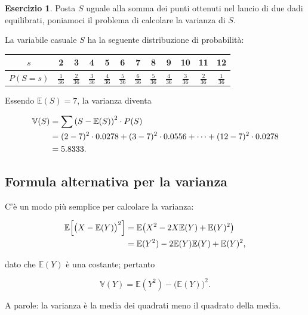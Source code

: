 \documentclass[
  11pt,
]{krantz}
\newcommand{\E}{\mathbb{E}} %
\theoremstyle{definition}
\theoremstyle{definition}
\theoremstyle{definition}
\newtheorem{exercise}{Esercizio}[chapter]
\theoremstyle{definition}
\theoremstyle{remark}
\begin{document}
\begin{exercise}
Posta \(S\) uguale alla somma dei punti ottenuti nel lancio di due dadi equilibrati, poniamoci il problema di calcolare la varianza di \(S\).

La variabile casuale \(S\) ha la seguente distribuzione di probabilità:

\begin{longtable}[]{@{}cccccccccccc@{}}
\toprule
\(s\) & 2 & 3 & 4 & 5 & 6 & 7 & 8 & 9 & 10 & 11 & 12 \\
\midrule
\endhead
\(P(S = s)\) & \(\frac{1}{36}\) & \(\frac{2}{36}\) & \(\frac{3}{36}\) & \(\frac{4}{36}\) & \(\frac{5}{36}\) & \(\frac{6}{36}\) & \(\frac{5}{36}\) & \(\frac{4}{36}\) & \(\frac{3}{36}\) & \(\frac{2}{36}\) & \(\frac{1}{36}\) \\
\bottomrule
\end{longtable}

\noindent Essendo \(\E(S) = 7\), la varianza diventa

\begin{align}
\mathbb{V}(S) &= \sum \left(S- \mathbb{E}(S)\right)^2 \cdot P(S) \notag\\
&= (2 - 7)^2 \cdot 0.0278 + (3-7)^2 \cdot 0.0556 + \dots + (12 - 7)^2 \cdot 0.0278 \notag\\
&= 5.8333.\notag
\end{align}
\end{exercise}

\hypertarget{formula-alternativa-per-la-varianza}{%
\subsection{Formula alternativa per la varianza}\label{formula-alternativa-per-la-varianza}}

C'è un modo più semplice per calcolare la varianza:

\begin{align}
\E\Big[\big(X - \E(Y)\big)^2\Big] &= \E\big(X^2 - 2X\E(Y) + \E(Y)^2\big)\notag\\
&= \E(Y^2) - 2\E(Y)\E(Y) + \E(Y)^2,\notag
\end{align}

dato che \(\E(Y)\) è una costante; pertanto

\begin{equation}
\mathbb{V}(Y) = \E(Y^2) - \big(\E(Y) \big)^2.
\label{eq:def-alt-var-rv}
\end{equation}

A parole: la varianza è la media dei quadrati meno il quadrato della media.
\end{document}
